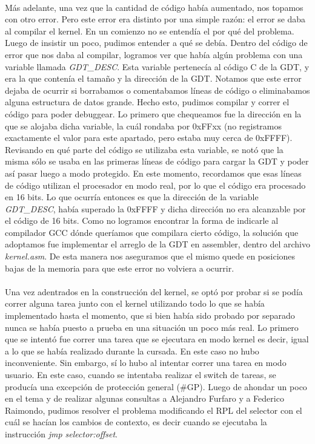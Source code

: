 \documentclass[11pt, a4paper]{article}
\begin{document}
	\paragraph{}
	Más adelante, una vez que la cantidad de código había aumentado, nos topamos con otro error. Pero este error era distinto por una simple razón: el error se daba al compilar el kernel. En un comienzo no se entendía el por qué del problema. Luego de insistir un poco, pudimos entender a qué se debía. Dentro del código de error que nos daba al compilar, logramos ver que había algún problema con una variable llamada \textit{GDT\_DESC}. Esta variable pertenecía al código C de la GDT, y era la que contenía el tamaño y la dirección de la GDT. Notamos que este error dejaba de ocurrir si borrabamos o comentabamos líneas de código o eliminabamos alguna estructura de datos grande. Hecho esto, pudimos compilar y correr el código para poder debuggear. Lo primero que chequeamos fue la dirección en la que se alojaba dicha variable, la cuál rondaba por 0xFFxx (no registramos exactamente el valor para este apartado, pero estaba muy cerca de 0xFFFF). Revisando en qué parte del código se utilizaba esta variable, se notó que la misma sólo se usaba en las primeras líneas de código para cargar la GDT y poder así pasar luego a modo protegido. En este momento, recordamos que esas líneas de código utilizan el procesador en modo real, por lo que el código era procesado en 16 bits. Lo que ocurría entonces es que la dirección de la variable \textit{GDT\_DESC}, había superado la 0xFFFF y dicha dirección no era alcanzable por el código de 16 bits. Como no logramos encontrar la forma de indicarle al compilador GCC dónde queríamos que compilara cierto código, la solución que adoptamos fue implementar el arreglo de la GDT en assembler, dentro del archivo \textit{kernel.asm}. De esta manera nos aseguramos que el mismo quede en posiciones bajas de la memoria para que este error no volviera a ocurrir.

	\paragraph{}
	Una vez adentrados en la construcción del kernel, se optó por probar si se podía correr alguna tarea junto con el kernel utilizando todo lo que se había implementado hasta el momento, que si bien había sido probado por separado nunca se había puesto a prueba en una situación un poco más real. Lo primero que se intentó fue correr una tarea que se ejecutara en modo kernel es decir, igual a lo que se había realizado durante la cursada. En este caso no hubo inconveniente. Sin embargo, sí lo hubo al intentar correr una tarea en modo usuario. En este caso, cuando se intentaba realizar el switch de tareas, se producía una excepción de protección general (\#GP). Luego de ahondar un poco en el tema y de realizar algunas consultas a Alejandro Furfaro y a Federico Raimondo, pudimos resolver el problema modificando el RPL del selector con el cuál se hacían los cambios de contexto, es decir cuando se ejecutaba la instrucción \textit{jmp selector:offset}.
\end{document}
